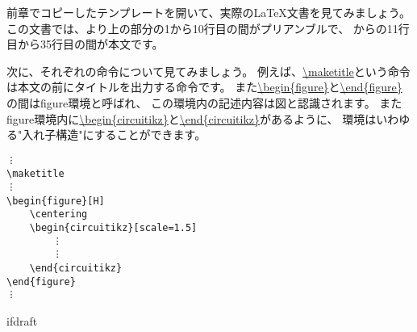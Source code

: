 		前章でコピーしたテンプレートを開いて、実際の\LaTeX 文書を見てみましょう。
		この文書では、\url{}より上の部分の1から10行目の間がプリアンブルで、
		\url{}から\url{}の11行目から35行目の間が本文です。
        
        次に、それぞれの命令について見てみましょう。
        例えば、\url{\maketitle}という命令は本文の前にタイトルを出力する命令です。
        また\url{\begin{figure}}と\url{\end{figure}}の間はfigure環境と呼ばれ、
        この環境内の記述内容は図と認識されます。
        またfigure環境内に\url{\begin{circuitikz}}と\url{\end{circuitikz}}があるように、
        環境はいわゆる"入れ子構造"にすることができます。
        \begin{mdframed}
			\begin{verbatim}
︙
\maketitle
︙
\begin{figure}[H]
    \centering
    \begin{circuitikz}[scale=1.5]
        ︙
        ︙
    \end{circuitikz}
\end{figure}
︙
			\end{verbatim}
		\end{mdframed}


		\expandafter\ifx\csname ifdraft\endcsname\relax
		
		\fi